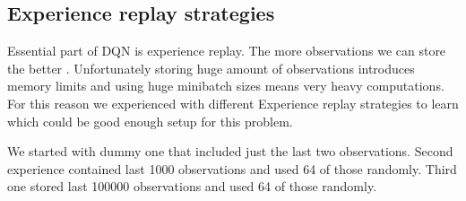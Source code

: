 \subsection{Experience replay strategies}
Essential part of DQN is experience replay. The more observations we can store the better \cite{mnih2015human}. Unfortunately storing huge amount of observations introduces memory limits and using huge minibatch sizes means very heavy computations. For this reason we experienced with different Experience replay strategies to learn which could be good enough setup for this problem.

We started with dummy one that included just the last two observations. Second experience contained last 1000 observations and used 64 of those randomly. Third one stored last 100000 observations and used 64 of those randomly.